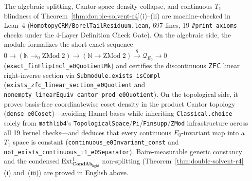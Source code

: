 \documentclass[10pt,twoside,openright]{book}
\theoremstyle{crmplain}
\theoremstyle{crmdef}
\theoremstyle{crmremark}
\begin{document}
The algebraic splitting, Cantor-space density collapse, and continuous $T_1$ blindness of Theorem~\ref{thm:double-solvent-r4}(i)--(ii) are machine-checked in Lean~4 (\texttt{HomotopyCRM/\allowbreak BorelTailResiduum.lean}, 697 lines, 19 \texttt{\#print axioms} checks under the 4-Layer Definition Check Gate). On the algebraic side, the module formalizes the short exact sequence $0 \to (\mathbb{N} \to_0 \mathrm{ZMod}\;2) \to (\mathbb{N} \to \mathrm{ZMod}\;2) \xrightarrow{q} \mathcal{Q}_{E_0} \to 0$ (\texttt{exact\_\allowbreak finFlipIncl\_\allowbreak e0QuotientMk}) and certifies the discontinuous $\mathsf{ZFC}$ linear right-inverse section via \texttt{Submodule.exists\_\allowbreak isCompl} (\texttt{exists\_\allowbreak zfc\_\allowbreak linear\_\allowbreak section\_\allowbreak e0Quotient} and \texttt{nonempty\_\allowbreak linearEquiv\_\allowbreak cantor\_\allowbreak prod\_\allowbreak e0Quotient}). On the topological side, it proves basis-free coordinatewise coset density in the product Cantor topology (\texttt{dense\_\allowbreak e0Coset})---avoiding Hamel bases while inheriting \texttt{Classical.choice} solely from \texttt{mathlib4}'s \texttt{TopologicalSpace}/\allowbreak\texttt{Pi}/\allowbreak\texttt{Finsupp}/\allowbreak\texttt{ZMod} infrastructure across all 19 kernel checks---and deduces that every continuous $E_0$-invariant map into a $T_1$ space is constant (\texttt{continuous\_\allowbreak e0Invariant\_\allowbreak const} and \texttt{not\_\allowbreak exists\_\allowbreak continuous\_\allowbreak t1\_\allowbreak e0Separator}). Baire-measurable generic constancy and the condensed $\mathrm{Ext}^1_{\mathbf{CondAb}_{\mathrm{light}}}$ non-splitting (Theorem~\ref{thm:double-solvent-r4}(i) and~(iii)) are proved in English above.
\end{document}
